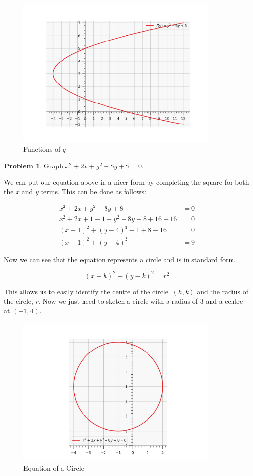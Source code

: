 \documentclass[12pt]{article}
\theoremstyle{definition}
\newtheorem{problem}{Problem}
\begin{document}
\begin{figure}[H]
    \centering
    \includegraphics[width=10cm, keepaspectratio]{graph_4.png}
    \caption{Functions of $y$}
    \label{fig:fig4}
\end{figure}

\begin{problem}
Graph $x^2 + 2x + y^2 - 8y + 8 = 0$.
\end{problem}

We can put our equation above in a nicer form by completing the square for both the $x$ and $y$ terms.
This can be done as follows:

\begin{align}
    x^2 + 2x + y^2 - 8y + 8                   & = 0 \\
    x^2 + 2x + 1 - 1 + y^2 - 8y + 8 + 16 - 16 & = 0 \\
    (x+1)^2 + (y-4)^2 - 1 + 8 - 16            & = 0 \\
    (x+1)^2 + (y-4)^2                         & = 9
\end{align}

Now we can see that the equation represents a circle and is in standard form.

\begin{equation}
    (x-h)^2 + (y-k)^2 = r^2
\end{equation}

This allows us to easily identify the centre of the circle, $(h, k)$ and the radius of the circle, $r$.
Now we just need to sketch a circle with a radius of $3$ and a centre at $(-1, 4)$.

\begin{figure}[H]
    \centering
    \includegraphics[width=10cm, keepaspectratio]{graph_5.png}
    \caption{Equation of a Circle}
    \label{fig:fig5}
\end{figure}
\end{document}
